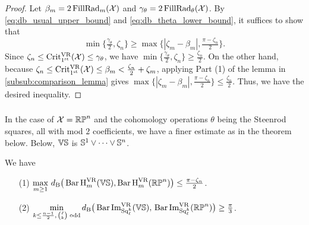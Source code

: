 \begin{proof}
    Let $\beta_m = 2\operatorname{FillRad}_{m}(\mathcal{X})$ and $\gamma_\theta = 2\operatorname{FillRad}_{\theta}(\mathcal{X})$.
    By \cref{eq:db_usual_upper_bound} and \cref{eq:db_theta_lower_bound}, it suffices to show that
    \[
    \min\big\{\tfrac{\gamma_\theta}{2}, \zeta_n\big\} \geq \max\big\{|\zeta_m - \beta_m|, \tfrac{\pi - \zeta_n}{2}\big\}.
    \]
    Since \(\zeta_n \leq \operatorname{Crit^{\mathrm{VR}}_{1^{\mathrm{st}}}}(\mathcal{X}) \leq \gamma_\theta\), we have
    \(
    \min\big\{\tfrac{\gamma_\theta}{2}, \zeta_n\big\} \geq \tfrac{\zeta_n}{2}.
    \)
    On the other hand, because \(\zeta_n \leq \operatorname{Crit^{\mathrm{VR}}_{1^{\mathrm{st}}}}(\mathcal{X}) \leq \beta_m < \tfrac{\zeta_n}{2} + \zeta_m\), applying Part (1) of the lemma in \cref{subsub:comparison_lemma} gives
    \(
    \max\big\{|\zeta_m - \beta_m|, \tfrac{\pi - \zeta_n}{2}\big\} \leq \tfrac{\zeta_n}{2}.
    \)
    Thus, we have the desired inequality.
\end{proof}

\subsubsection{}

In the case of $\mathcal{X} = \mathbb{RP}^n$ and the cohomology operations $\theta$ being the Steenrod squares, all with mod $2$ coefficients, we have a finer estimate as in the theorem below.
Below, $\mathbb{V}\mathbb{S}$ is $\mathbb{S}^1\vee\dots\vee \mathbb{S}^n$.

\medskip\theorem
We have
\begin{itemize}
	\item[(1)] $\displaystyle \max_{m\geq 1}\, d_{\mathrm{B}}\big(\operatorname{Bar} \operatorname{H}_{m}^{\mathrm{VR}} (\mathbb{V}\mathbb{S}), \operatorname{Bar} \operatorname{H}_{m}^{\mathrm{VR}} (\mathbb{RP}^n)\big)\leq \tfrac{\pi - \zeta_n}{2}$.
	\smallskip
    \item[(2)] $\displaystyle \min_{%
    k \leq \frac{n-1}{2},\, \binom{\ell}{k}\text{ odd}} \db\big(\sqbarcl{k}{\ell}{\VS},\, \sqbarcl{k}{\ell}{\rp^n}\big)\geq \tfrac{\pi}{3}$. %
\end{itemize}

